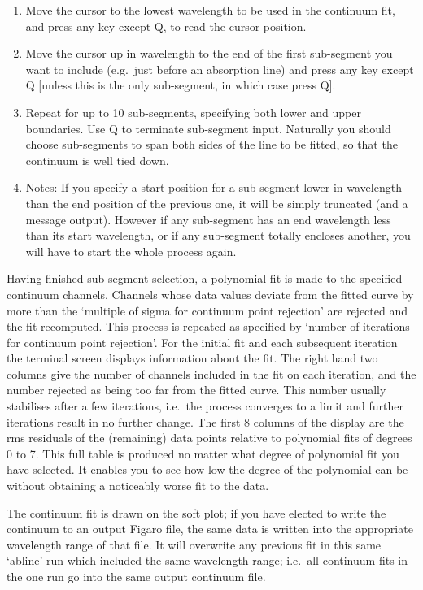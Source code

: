 \documentclass[11pt,twoside]{article}
\begin{document}
\begin{enumerate}
\item
   Move the cursor to the lowest wavelength to be used in the continuum
   fit, and press any key except Q, to read the cursor position.
\item
   Move the cursor up in wavelength to the end of the first sub-segment
   you want to include (e.g.\ just before an absorption line) and press
   any key except Q [unless this is the only sub-segment, in which case
   press Q].
\item
   Repeat for up to 10 sub-segments, specifying both lower and upper
   boundaries. Use Q to terminate sub-segment input.  Naturally you
   should choose sub-segments to span both sides of the line to be
   fitted, so that the continuum is well tied down.
\item
   Notes: If you specify a start position for a sub-segment lower in
   wavelength than the end position of the previous one, it will be
   simply truncated (and a message output). However if any sub-segment
   has an end wavelength less than its start wavelength, or if any
   sub-segment totally encloses another, you will have to start the whole
   process again.
\end{enumerate}

   Having finished sub-segment selection, a polynomial fit is made to
   the specified continuum channels. Channels whose data values deviate
   from the fitted curve by more than the `multiple of sigma for
   continuum point rejection' are rejected and the fit recomputed. This
   process is repeated as specified by `number of iterations for
   continuum point rejection'. For the initial fit and each subsequent
   iteration the terminal screen displays information about the fit. The
   right hand two columns give the number of channels included in the
   fit on each iteration, and the number rejected as being too far from
   the fitted curve. This number usually stabilises after a few
   iterations, i.e.\ the process converges to a limit and further
   iterations result in no further change. The first 8 columns of the
   display are the rms residuals of the (remaining) data points relative
   to polynomial fits of degrees 0 to 7. This full table is produced no
   matter what degree of polynomial fit you have selected. It enables
   you to see how low the degree of the polynomial can be without
   obtaining a noticeably worse fit to the data.

   The continuum fit is drawn on the soft plot; if you have elected to
   write the continuum to an output Figaro file, the same data is
   written into the appropriate wavelength range of that file. It will
   overwrite any previous fit in this same `abline' run which included
   the same wavelength range; i.e.\ all continuum fits in the one run go
   into the same output continuum file.
\end{document}

